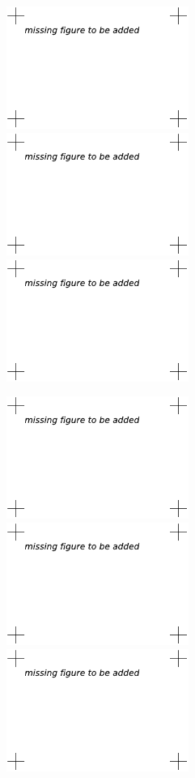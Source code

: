 \begin{figure}[bhpt]
\centerline{
\includegraphics[height=4cm]{chapters/hoffman-1/pdf/naca_0012-vel1-aoa4-bw.pdf}
\includegraphics[height=4cm]{chapters/hoffman-1/pdf/naca_0012-vel1-aoa10-bw.pdf}
\includegraphics[height=4cm]{chapters/hoffman-1/pdf/naca_0012-vel1-aoa18-bw.pdf}
}
\centerline{
\includegraphics[height=4cm]{chapters/hoffman-1/pdf/naca_0012-aoa4-bw.pdf}
\includegraphics[height=4cm]{chapters/hoffman-1/pdf/naca_0012-aoa10-bw.pdf}
\includegraphics[height=4cm]{chapters/hoffman-1/pdf/naca_0012-aoa18-bw.pdf}
}
\end{figure}
